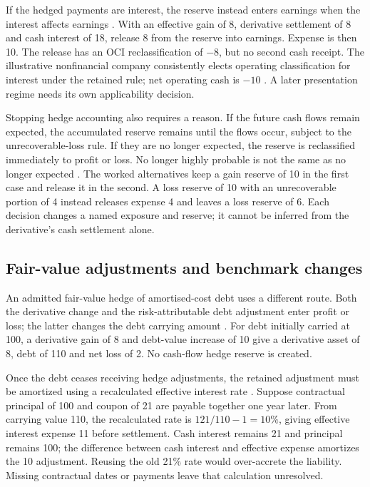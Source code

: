 If the hedged payments are interest, the reserve instead enters earnings when
the interest affects earnings \citep[6.5.11(d)(ii)]{aasb9dated}. With an
effective gain of 8, derivative settlement of 8 and cash interest of 18,
release 8 from the reserve into earnings. Expense is then 10. The release
has an OCI reclassification of $-8$, but no second cash receipt. The
illustrative nonfinancial company consistently elects operating classification
for interest under the retained rule; net operating cash is $-10$
\citep[31--33]{aasb107dated}. A later presentation regime needs its own
applicability decision.

Stopping hedge accounting also requires a reason. If the future cash flows
remain expected, the accumulated reserve remains until the flows occur,
subject to the unrecoverable-loss rule. If they are no longer expected, the
reserve is reclassified immediately to profit or loss. No longer highly
probable is not the same as no longer expected
\citep[6.5.11(d)(iii) and 6.5.12]{aasb9dated}. The worked alternatives keep
a gain reserve of 10 in the first case and release it in the second. A loss
reserve of 10 with an unrecoverable portion of 4 instead releases expense 4
and leaves a loss reserve of 6. Each decision changes a named exposure and
reserve; it cannot be inferred from the derivative's cash settlement alone.

\subsection{Fair-value adjustments and benchmark changes}

An admitted fair-value hedge of amortised-cost debt uses a different route.
Both the derivative change and the risk-attributable debt adjustment enter
profit or loss; the latter changes the debt carrying amount
\citep[6.5.8]{aasb9dated}. For debt initially carried at 100, a derivative
gain of 8 and debt-value increase of 10 give a derivative asset of 8, debt
of 110 and net loss of 2. No cash-flow hedge reserve is created.

Once the debt ceases receiving hedge adjustments, the retained adjustment
must be amortized using a recalculated effective interest rate
\citep[6.5.10]{aasb9dated}. Suppose contractual principal of 100 and coupon
of 21 are payable together one year later. From carrying value 110, the
recalculated rate is $121/110-1=10\%$, giving effective interest expense
11 before settlement. Cash interest remains 21 and principal remains 100;
the difference between cash interest and effective expense amortizes the
10 adjustment. Reusing the old 21\% rate would over-accrete the liability.
Missing contractual dates or payments leave that calculation unresolved.

